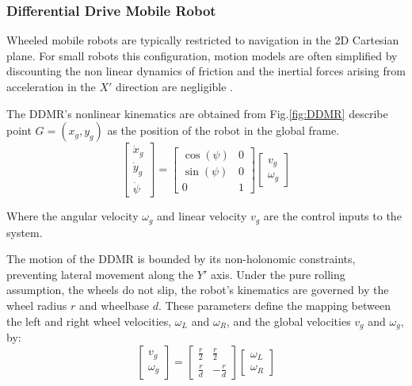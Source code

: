     \subsubsection{Differential Drive Mobile Robot}
    Wheeled mobile robots are typically restricted to navigation in the 2D Cartesian plane. For small robots 
    this configuration, motion models are often simplified by discounting the non linear dynamics of friction and 
    the inertial forces arising from acceleration in the $X'$ direction are negligible \cite{KinematicWheeled}. 

    The DDMR's nonlinear kinematics are obtained from Fig.\ref{fig:DDMR} describe point $G=(x_g,y_g)$ as the position of 
    the robot in the global frame.
    \begin{equation}
        \begin{bmatrix}
            \dot x_g \\
            \dot y_g \\
            \dot \psi
        \end{bmatrix}
        =
        \begin{bmatrix}
            \cos(\psi) & 0 \\
            \sin(\psi) & 0 \\
            0 & 1
        \end{bmatrix}
        \begin{bmatrix}
            v_g \\
            \omega_g
        \end{bmatrix}
        \label{eq:DDMRGlobal}
    \end{equation}

    Where the angular velocity $\omega_g$ and linear velocity $v_g$ are the control 
    inputs to the system. 

    The motion of the DDMR is bounded by its non-holonomic constraints, 
    preventing lateral movement along the $Y'$ axis. 
    Under the pure rolling assumption, the wheels do not slip, the robot's kinematics 
    are governed by the wheel radius $r$ and wheelbase $d$. These parameters define 
    the mapping between the left and right wheel velocities, $\omega_L$ and $\omega_R$, 
    and the global velocities $v_g$ and $\omega_g$, by:
    \begin{equation}
        \begin{bmatrix}
            v_g \\
            \omega_g
        \end{bmatrix}
        =
        \begin{bmatrix}
            \frac{r}{2} & \frac{r}{2} \\
            \frac{r}{d} & -\frac{r}{d}
        \end{bmatrix}
        \begin{bmatrix}
            \omega_L \\
            \omega_R
        \end{bmatrix}
        \label{eq:DDMR}
    \end{equation}

